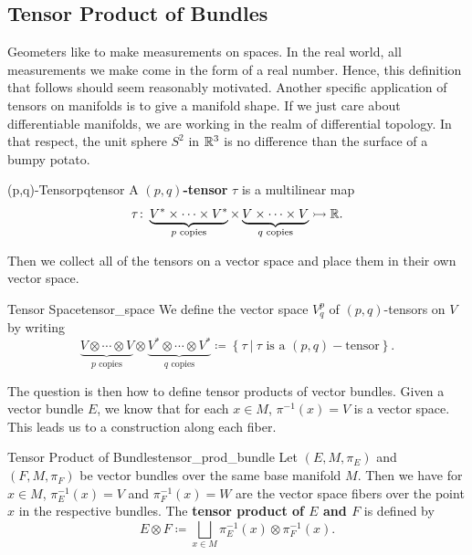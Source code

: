 
\subsection{Tensor Product of Bundles}

Geometers like to make measurements on spaces.  In the real world, all measurements we make come in the form of a real number.  Hence, this definition that follows should seem reasonably motivated. Another specific application of tensors on manifolds is to give a manifold shape.  If we just care about differentiable manifolds, we are working in the realm of differential topology.  In that respect, the unit sphere $S^2$ in $\mathbb{R}^3$ is no difference than the surface of a bumpy potato.

\begin{df}{(p,q)-Tensor}{pqtensor}
A \textbf{$(p,q)$-tensor} $\tau$ is a multilinear map
\[
\tau\colon \underbrace{V^*\times \cdots \times V^*}_{\textrm{$p$ copies}}\times \underbrace{V\times \cdots \times V}_{\textrm{$q$ copies}} \rightarrowtail \mathbb{R}.
\]
\end{df}

Then we collect all of the tensors on a vector space and place them in their own vector space.

\begin{df}{Tensor Space}{tensor_space}
We define the vector space $V^p_q$ of $(p,q)$-tensors on $V$ by writing
\[
\underbrace{V\otimes \cdots \otimes V}_{\textrm{$p$ copies}} \otimes \underbrace{V^*\otimes \cdots \otimes V^*}_{\textrm{$q$ copies}} \coloneqq \left\{ \tau ~\vert~ \textrm{$\tau$ is a $(p,q)-$tensor}\right\}.
\]
\end{df}

The question is then how to define tensor products of vector bundles.  Given a vector bundle $E$, we know that for each $x\in M$, $\pi^{-1}(x)=V$ is a vector space.  This leads us to a construction along each fiber. 

\begin{df}{Tensor Product of Bundles}{tensor_prod_bundle}
Let $(E,M,\pi_E)$ and $(F,M,\pi_F)$ be vector bundles over the same base manifold $M$.  Then we have for $x\in M$, $\pi_E^{-1}(x)=V$ and $\pi_F^{-1}(x)=W$ are the vector space fibers over the point $x$ in the respective bundles. The \textbf{tensor product of $E$ and $F$} is defined by
\[
E\otimes F \coloneqq \bigsqcup_{x\in M} \pi_E^{-1}(x)\otimes \pi_F^{-1}(x).
\]
\end{df}

